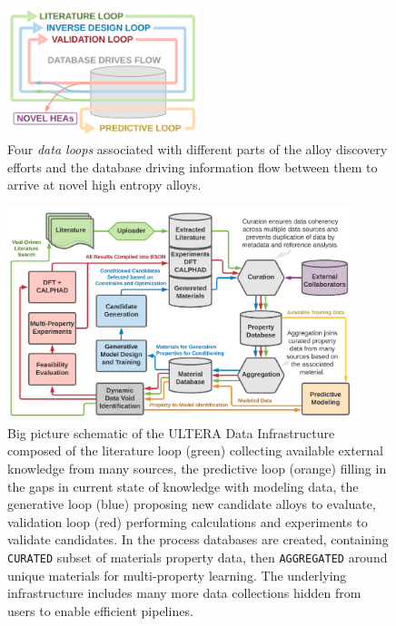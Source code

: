 \begin{figure}[H]
    \centering
    \includegraphics[width=0.5\textwidth]{ultera/PersepctivePaper_DataFlow_V2.png}
    \caption{Four \emph{data loops} associated with different parts of the alloy discovery efforts and the database driving information flow between them to arrive at novel high entropy alloys.}
    \label{ultera:fig:dataloops}
\end{figure}

\begin{figure}[H]
    \centering
    \includegraphics[width=0.9\textwidth]{ultera/PersepctivePaper_Ecosystem_V6.png}
    \caption{Big picture schematic of the ULTERA Data Infrastructure composed of the literature loop (green) collecting available external knowledge from many sources, the predictive loop (orange) filling in the gaps in current state of knowledge with modeling data, the generative loop (blue) proposing new candidate alloys to evaluate, validation loop (red) performing calculations and experiments to validate candidates. In the process databases are created, containing \texttt{CURATED} subset of materials property data, then \texttt{AGGREGATED} around unique materials for multi-property learning. The underlying infrastructure includes many more data collections hidden from users to enable efficient pipelines.}
    \label{ultera:fig:dataschematic}
\end{figure}


